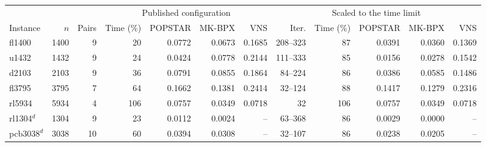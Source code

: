 \begin{tabular}{lrrrrrrrrrrr}
\toprule
 & & & \multicolumn{4}{c}{Published configuration} & \multicolumn{5}{c}{Scaled to the time limit} \\
\cmidrule(lr){4-7}\cmidrule(lr){8-12}
Instance & $n$ & Pairs & Time (\%) & POPSTAR & MK-BPX & VNS & Iter. & Time (\%) & POPSTAR & MK-BPX & VNS \\
\midrule
fl1400 & 1400 & 9 & 20 & 0.0772 & 0.0673 & 0.1685 & 208--323 & 87 & 0.0391 & 0.0360 & 0.1369 \\
u1432 & 1432 & 9 & 24 & 0.0424 & 0.0778 & 0.2144 & 111--333 & 85 & 0.0156 & 0.0278 & 0.1542 \\
d2103 & 2103 & 9 & 36 & 0.0791 & 0.0855 & 0.1864 & 84--224 & 86 & 0.0386 & 0.0585 & 0.1486 \\
fl3795 & 3795 & 7 & 64 & 0.1662 & 0.1381 & 0.2414 & 32--124 & 88 & 0.1417 & 0.1279 & 0.2316 \\
rl5934 & 5934 & 4 & 106 & 0.0757 & 0.0349 & 0.0718 & 32 & 106 & 0.0757 & 0.0349 & 0.0718 \\
\midrule
rl1304$^{d}$ & 1304 & 9 & 23 & 0.0112 & 0.0024 & -- & 63--368 & 86 & 0.0029 & 0.0000 & -- \\
pcb3038$^{d}$ & 3038 & 10 & 60 & 0.0394 & 0.0308 & -- & 32--107 & 86 & 0.0238 & 0.0205 & -- \\
\bottomrule
\end{tabular}